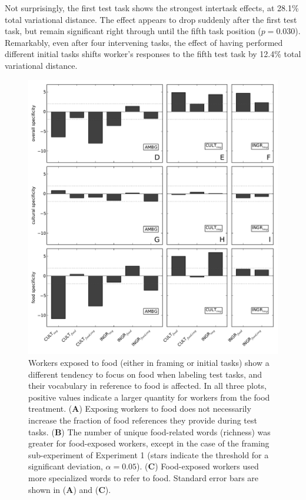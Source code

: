\documentclass{sigchi}
\begin{document}
Not surprisingly, the first test task shows the strongest intertask 
effects, at 28.1\% total variational distance.  The effect appears to 
drop suddenly after the first test task, but remain significant 
right through until the fifth task position ($p=0.030$).
Remarkably, even after four intervening tasks, the effect of 
having performed different initial tasks shifts worker's responses to the
fifth test task by 12.4\% total variational distance.

\begin{figure}
	\centering
	\includegraphics[scale=0.87]{figs/specificity.pdf}
	\caption{
		Workers exposed to food (either in framing or initial tasks)
		show a different tendency to focus on food when labeling
		test tasks, and their vocabulary in reference to food is affected.
		In all three plots, positive values indicate a larger quantity for 
		workers from the food treatment.
		(\textbf{A}) Exposing workers to food does not necessarily increase
		the fraction of food references they provide during test tasks.
		(\textbf{B}) The number of unique food-related
		words (richness) was greater for food-exposed workers, 
		except in the 
		case of the framing sub-experiment of Experiment 1 
		(stars indicate the threshold
		for a significant deviation, $\alpha=0.05$). 
		(\textbf{C}) Food-exposed
		workers used more specialized words to refer to food.
		Standard error bars are shown in (\textbf{A}) and (\textbf{C}).
	}
	\label{fig:specificity}
\end{figure}
\end{document}
